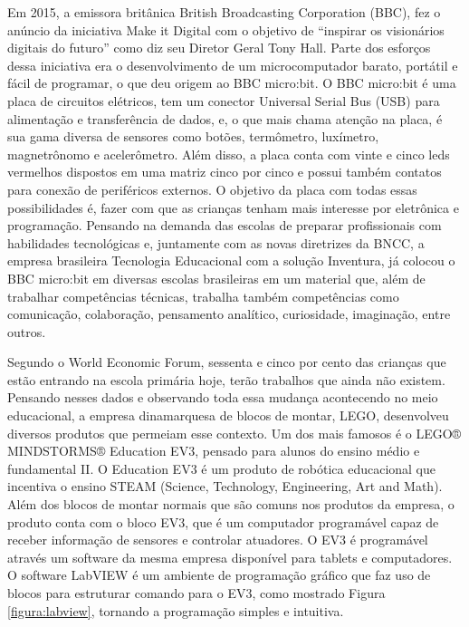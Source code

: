 Em 2015, a emissora britânica British Broadcasting Corporation (BBC), fez o anúncio da iniciativa Make it Digital com o objetivo de “inspirar os visionários digitais do futuro” como diz seu Diretor Geral Tony Hall. Parte dos esforços dessa iniciativa era o desenvolvimento de um microcomputador barato, portátil e fácil de programar, o que deu origem ao BBC micro:bit. O BBC micro:bit é uma placa de circuitos elétricos, tem um conector Universal Serial Bus (USB) para alimentação e transferência de dados, e, o que mais chama atenção na placa, é sua gama diversa de sensores como botões, termômetro, luxímetro, magnetrônomo e acelerômetro. Além disso, a placa conta com vinte e cinco leds vermelhos dispostos em uma matriz cinco por cinco e possui também contatos para conexão de periféricos externos. O objetivo da placa com todas essas possibilidades é, fazer com que as crianças tenham mais interesse por eletrônica e programação. Pensando na demanda das escolas de preparar profissionais com habilidades tecnológicas e, juntamente com as novas diretrizes da BNCC, a empresa brasileira Tecnologia Educacional com a solução Inventura, já colocou o BBC micro:bit em diversas escolas brasileiras em um material que, além de trabalhar competências técnicas, trabalha também competências como comunicação, colaboração, pensamento analítico, curiosidade, imaginação, entre outros. 

Segundo o World Economic Forum, sessenta e cinco por cento das crianças que estão entrando na escola primária hoje, terão trabalhos que ainda não existem. Pensando  nesses dados e observando toda essa mudança acontecendo no meio educacional, a empresa dinamarquesa de blocos de montar, LEGO, desenvolveu diversos produtos que permeiam esse contexto. Um dos mais famosos é o LEGO® MINDSTORMS® Education EV3, pensado para alunos do ensino médio e fundamental II. O Education EV3 é um produto de robótica educacional que incentiva o ensino STEAM (Science, Technology, Engineering, Art and Math). Além dos blocos de montar normais que são comuns nos produtos da empresa, o produto conta com o bloco EV3, que é um computador programável capaz de receber informação de sensores e controlar atuadores. O EV3 é programável através um software da mesma empresa disponível para tablets e computadores. O software LabVIEW é um ambiente de programação gráfico que faz uso de blocos para estruturar comando para o EV3, como mostrado Figura \ref{figura:labview}, tornando a programação simples e intuitiva. 

